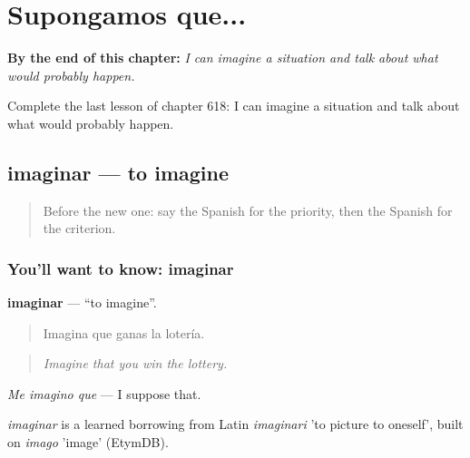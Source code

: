 
\chapter{Supongamos que...}
\label{ch:es-supongamos-que}

\begin{chapteropening}
\textbf{By the end of this chapter:} \emph{I can imagine a situation and talk about what would probably happen.}

Complete the last lesson of chapter 618: I can imagine a situation and talk about what would probably happen.
\end{chapteropening}

\section[imaginar]{imaginar — to imagine}

\label{lesson:ES-C618-imaginar}



\begin{quote}
Before the new one: say the Spanish for the priority, then the Spanish for the criterion.
\end{quote}

\subsection*{You'll want to know: imaginar}
\textbf{imaginar} — \textquotedblleft{}to imagine\textquotedblright{}.

\begin{quote}
Imagina que ganas la lotería.
\end{quote}

\begin{quote}
\emph{Imagine that you win the lottery.}
\end{quote}

\emph{Me imagino que} — I suppose that.

\begin{cousinweb}
\emph{imaginar} is a learned borrowing from Latin \emph{imaginari} 'to picture to oneself', built on \emph{imago} 'image' (EtymDB).
\end{cousinweb}

